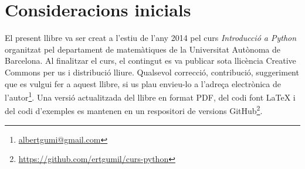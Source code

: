 \chapter*{Consideracions inicials}
\thispagestyle{empty}

El present llibre va ser creat a l'estiu de l'any 2014 pel curs \emph{Introducció a Python} organitzat pel departament de matemàtiques de la Universitat Autònoma de Barcelona. Al finalitzar el curs, el contingut es va publicar sota llicència Creative Commons per us i distribució lliure. Qualsevol correcció, contribució, suggeriment que es vulgui fer a aquest llibre, si us plau envieu-lo a l'adreça electrònica de l'autor\footnote{\href{mailto:albertgumi@gmail.com}{albertgumi@gmail.com}}. Una versió actualitzada del llibre en format PDF, del codi font \LaTeX{} i del codi d'exemples es mantenen en un respositori de versions GitHub\footnote{\url{https://github.com/ertgumil/curs-python}}.